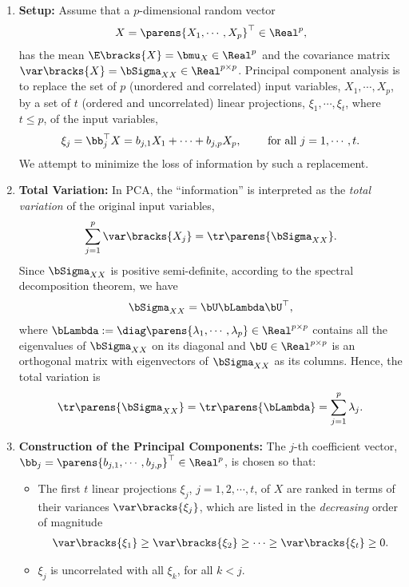 \documentclass[12pt]{article}
\begin{document}
\begin{enumerate}[label=\textbf{\arabic*.}]

	\item \textbf{Setup:} Assume that a $p$-dimensional random vector
	\begin{align*}
		X = \parens{X_1, \cdots, X_p}^\top \in \Real^p, 
	\end{align*}
	has the mean $\E \bracks{X} = \bmu_{X} \in \Real^p$ and the covariance matrix $\var \bracks{X} = \bSigma_{XX} \in \Real^{p \times p}$. Principal component analysis is to replace the set of $p$ (unordered and correlated) input variables, $X_1, \cdots, X_p$, by a set of $t$ (ordered and uncorrelated) linear projections, $\xi_1, \cdots, \xi_t$, where $t \le p$, of the input variables, 
	\begin{align}\label{xij}
		\xi_j = \bb_j^\top X = b_{j,1} X_1 + \cdots + b_{j,p} X_p, \qquad \text{ for all } j = 1, \cdots, t. 
	\end{align}
	We attempt to minimize the loss of information by such a replacement. 
	
	\item \textbf{Total Variation:} In PCA, the ``information'' is interpreted as the \textit{total variation} of the original input variables, 
	\begin{align*}
		\sum_{j=1}^p \var \bracks{X_j} = \tr \parens{\bSigma_{XX}}. 
	\end{align*}
	Since $\bSigma_{XX}$ is positive semi-definite, according to the spectral decomposition theorem, we have 
	\begin{align*}
		\bSigma_{XX} = \bU \bLambda \bU^\top, 
	\end{align*}
	where $\bLambda := \diag \parens{\lambda_1, \cdots, \lambda_p} \in \Real^{p \times p}$ contains all the eigenvalues of $\bSigma_{XX}$ on its diagonal and $\bU \in \Real^{p \times p}$ is an orthogonal matrix with eigenvectors of $\bSigma_{XX}$ as its columns. Hence, the total variation is 
	\begin{align*}
		\tr \parens{\bSigma_{XX}} = \tr \parens{\bLambda} = \sum_{j=1}^p \lambda_j. 
	\end{align*}
	
	\item \textbf{Construction of the Principal Components:} The $j$-th coefficient vector, $\bb_j = \parens{b_{j,1}, \cdots, b_{j,p}}^\top \in \Real^p$, is chosen so that: 
	\begin{itemize}
		\item The first $t$ linear projections $\xi_j$, $j = 1, 2, \cdots, t$, of $X$ are ranked in terms of their variances $\var \bracks{\xi_j}$, which are listed in the \emph{decreasing} order of magnitude 
		\begin{align*}
			\var \bracks{\xi_1} \ge \var \bracks{\xi_2} \ge \cdots \ge \var \bracks{\xi_t} \ge 0. 
		\end{align*}
		\item $\xi_j$ is uncorrelated with all $\xi_k$, for all $k < j$. 
	\end{itemize}

\end{enumerate}
\end{document}
